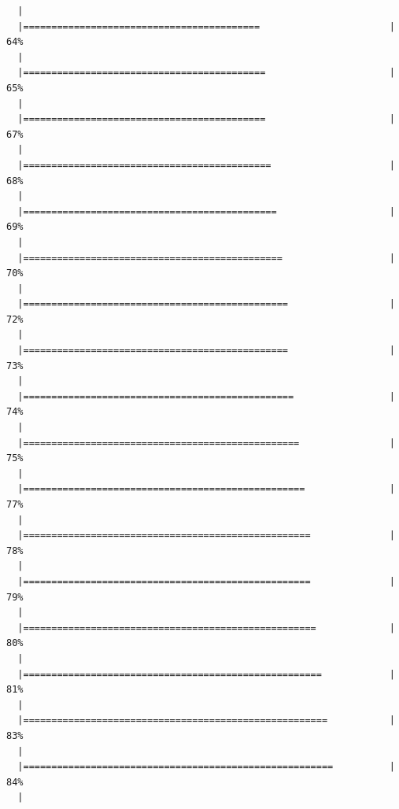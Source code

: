 \documentclass[]{article}
\begin{document}
\begin{verbatim}
  |                                                                       
  |==========================================                       |  64%
  |                                                                       
  |===========================================                      |  65%
  |                                                                       
  |===========================================                      |  67%
  |                                                                       
  |============================================                     |  68%
  |                                                                       
  |=============================================                    |  69%
  |                                                                       
  |==============================================                   |  70%
  |                                                                       
  |===============================================                  |  72%
  |                                                                       
  |===============================================                  |  73%
  |                                                                       
  |================================================                 |  74%
  |                                                                       
  |=================================================                |  75%
  |                                                                       
  |==================================================               |  77%
  |                                                                       
  |===================================================              |  78%
  |                                                                       
  |===================================================              |  79%
  |                                                                       
  |====================================================             |  80%
  |                                                                       
  |=====================================================            |  81%
  |                                                                       
  |======================================================           |  83%
  |                                                                       
  |=======================================================          |  84%
  |                                                                       

\end{verbatim}
\end{document}
